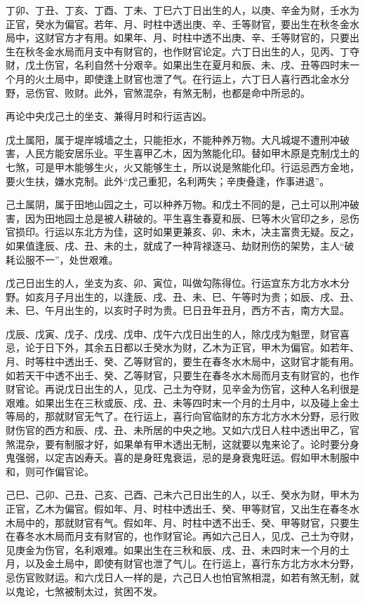 \documentclass[a5paper,oneside,12pt]{ctexbook}
\begin{document}
丁卯、丁丑、丁亥、丁酉、丁未、丁巳六丁日出生的人，以庚、辛金为财，壬水为正官，癸水为偏官。若年、月、时柱中透出庚、辛、壬等财官，要出生在秋冬金水局中，这财官方才有用。如果年、月、时柱中透不出庚、辛、壬等财官的，只要出生在秋冬金水局而月支中有财官的，也作财官论定。六丁日出生的人，见丙、丁夺财，戊土伤官，名利自然十分艰辛。如果出生在夏月和辰、未、戌、丑等四时末一个月的火土局中，即使逢上财官也泄了气。在行运上，六丁日人喜行西北金水分野，忌伤官、败财。此外，官煞混杂，有煞无制，也都是命中所忌的。

再论中央戊己土的坐支、兼得月时和行运吉凶。

戊土属阳，属于堤岸城墙之土，只能拒水，不能种养万物。大凡城堤不遭刑冲破害，人民方能安居乐业。平生喜甲乙木，因为煞能化印。替如甲木原是克制戊土的七煞，可是甲木能够生火，火又能够生土，所以说是煞能化印。行运忌西方金地，要火生扶，嫌水克制。此外“戊己重犯，名利两失；辛庚叠逢，作事进退”。

己土属阴，属于田地山园之土，可以种养万物。和戊土不同的是，己土可以刑冲破害，因为田地园土总是被人耕破的。平生喜生春夏和辰、巳等木火官印之乡，忌伤官损印。行运以东北方为佳，这时如果更兼亥、卯、未木，决主富贵无疑。反之，如果值逢辰、戌、丑、未的土，就成了一种背禄逐马、劫财刑伤的架势，主人“破耗讼服不一”，处世艰难。

戊己日出生的人，坐支为亥、卯、寅位，叫做勾陈得位。行运宜东方北方水木分野。如亥月子月出生的，以逢辰、戌、丑、未、巳、午等时为贵；如辰、戌、丑、未、巳、午月出生的，以亥时子时为贵。巳日丑年丑月，西方不吉，南方大显。

戊辰、戊寅、戊子、戊戌、戊申、戊午六戊日出生的人，除戊戌为魁罡，财官喜忌，论于日下外，其余五日都以壬癸水为财，乙木为正官，甲木为偏官。如若年、月、时等柱中透出壬、癸、乙等财官的，要生在春冬水木局中，这财官才能有用。如若天干中透不出壬、癸、乙等财官，只要生在春冬水木局而月支有财官的，也作财官论。再说戊日出生的人，见戊、己土为夺财，见辛金为伤官，这种人名利很是艰难。如果出生在三秋或辰、戌、丑、未等四时末一个月的土月中，以及碰上金土等局的，那就财官无气了。在行运上，喜行向官临财的东方北方水木分野，忌行败财伤官的西方和辰、戌、丑、未所居的中央之地。又如六戊日人柱中透出甲乙，官煞混杂，要有制服才好，如果单有甲木透出无制，这就要以鬼来论了。论时要分身鬼强弱，以定吉凶寿夭。喜的是身旺鬼衰运，忌的是身衰鬼旺运。假如甲木制服中和，则可作偏官论。

己巳、己卯、己丑、己亥、己酉、己未六己日出生的人，以壬、癸水为财，甲木为正官，乙木为偏官。假如年、月、时柱中透出壬、癸、甲等财官，又出生在春冬水木局中的，那就财官有气。假如年、月、时柱中透不出壬、癸、甲等财官，只要生在春冬水木局而月支有财官的，也作财官论。再如六己日人，见戊、己土为夺财，见庚金为伤官，名利艰难。如果出生在三秋和辰、戌、丑、未四时末一个月的土月，以及金土局中，即使有财官也泄了气儿。在行运上，喜行东方北方水木分野，忌伤官败财运。和六戊日人一样的是，六己日人也怕官煞相混，如若有煞无制，就以鬼论，七煞被制太过，贫困不发。
\end{document}
